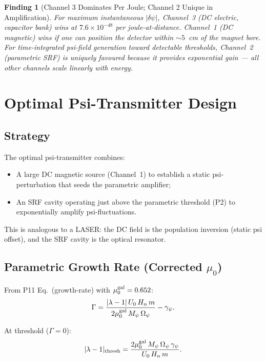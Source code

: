 \documentclass[11pt,twocolumn]{article}
\newcommand{\dpsi}{\delta\psi}
\newcommand{\lam}{\lambda}
\newcommand{\Opsi}{\Omega_\psi}
\newcommand{\gpsi}{\gamma_\psi}
\newcommand{\Mpsi}{M_\psi}
\newtheorem{finding}{Finding}
\begin{document}
\begin{finding}[Channel 3 Dominates Per Joule; Channel 2 Unique in Amplification]
\label{find:channel_ranking}
For maximum instantaneous $|\dpsi|$, Channel~3 (DC electric, capacitor bank)
wins at $7.6\times10^{-48}$ per joule-at-distance. Channel~1 (DC magnetic)
wins if one can position the detector within $\sim 5$~cm of the magnet bore.
For time-integrated psi-field generation toward detectable thresholds,
Channel~2 (parametric SRF) is uniquely favoured because it provides
exponential gain --- all other channels scale linearly with energy.
\end{finding}


\section{Optimal Psi-Transmitter Design}
\label{sec:transmitter}

\subsection{Strategy}

The optimal psi-transmitter combines:
\begin{itemize}[nosep]
\item A large DC magnetic source (Channel~1) to establish a static
psi-perturbation that seeds the parametric amplifier;
\item An SRF cavity operating just above the parametric threshold (P2)
to exponentially amplify psi-fluctuations.
\end{itemize}
This is analogous to a LASER: the DC field is the population inversion
(static psi offset), and the SRF cavity is the optical resonator.

\subsection{Parametric Growth Rate (Corrected $\mu_0$)}

From P11 Eq.~(growth-rate) with $\mu_0^{\rm gal} = 0.652$:
\begin{equation}
\Gamma = \frac{|\lam-1|\,U_0\,H_n\,m}{2\mu_0^{\rm gal}\,\Mpsi\,\Opsi} - \gpsi.
\label{eq:growth_rate_w3i2}
\end{equation}

At threshold ($\Gamma = 0$):
\begin{equation}
|\lam-1|_{\rm thresh} = \frac{2\mu_0^{\rm gal}\,\Mpsi\,\Opsi\,\gpsi}
{U_0\,H_n\,m}.
\label{eq:threshold_w3i2}
\end{equation}
\end{document}
